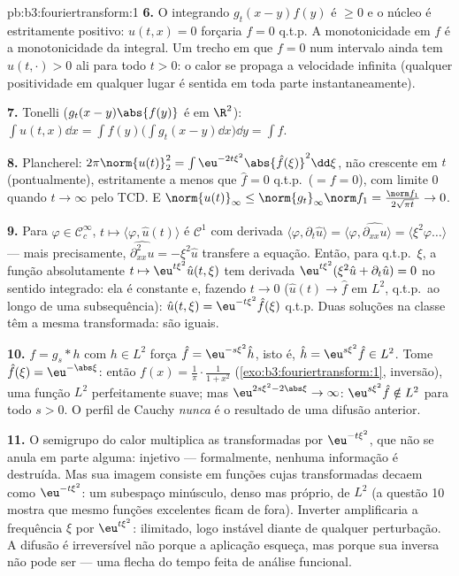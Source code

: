 \begin{solution}{pb:b3:fouriertransform:1}
\textbf{6.} O integrando $g_t(x-y)f(y)$ é $\geq 0$ e o
núcleo é estritamente positivo: $u(t,x) = 0$ forçaria $f = 0$
q.t.p. A monotonicidade em $f$ é a monotonicidade da integral. Um
trecho em que $f = 0$ num intervalo ainda tem $u(t, \cdot) > 0$
ali para todo $t > 0$: o calor se propaga a velocidade infinita
(qualquer positividade em qualquer lugar é sentida em toda parte instantaneamente).

\textbf{7.} Tonelli ($g_t(x-y)\abs{f(y)}$ é  em
$\R^2$): $\int u(t,x)\dd x = \int f(y)\bigl(\int g_t(x -
y)\dd x\bigr)\dd y = \int f$.

\textbf{8.} Plancherel: $2\pi\norm{u(t)}_2^2 =
\int\eu^{-2t\xi^2}\abs{\hat f(\xi)}^2\dd\xi$, não crescente em
$t$ (pontualmente), estritamente a menos que $\hat f = 0$ q.t.p.\ ($= f =
0$), com limite $0$ quando $t\to\infty$ pelo TCD. E
$\norm{u(t)}_\infty \leq \norm{g_t}_\infty\norm f_1 =
\frac{\norm f_1}{2\sqrt{\pi t}} \to 0$.

\textbf{9.} Para $\varphi \in \mathcal C_c^\infty$, $t \mapsto
\langle\varphi, \hat u(t)\rangle$ é $\mathcal C^1$ com
derivada $\langle\varphi, \partial_t\hat u\rangle =
\langle\varphi, \widehat{\partial_{xx}u}\rangle =
\langle\xi^2\varphi\dots\rangle$ --- mais precisamente,
$\widehat{\partial^2_{xx}u} = -\xi^2\hat u$ transfere a
equação. Então, para q.t.p.\ $\xi$, a função absolutamente 
$t \mapsto \eu^{t\xi^2}\hat u(t,\xi)$ tem derivada
$\eu^{t\xi^2}(\xi^2\hat u + \partial_t\hat u) = 0$ no
sentido integrado: ela é constante e, fazendo $t \to 0$
($\hat u(t) \to \hat f$ em $L^2$, q.t.p.\ ao longo de uma subsequência):
$\hat u(t, \xi) = \eu^{-t\xi^2}\hat f(\xi)$ q.t.p. Duas
soluções na classe têm a mesma transformada: são
iguais.

\textbf{10.} $f = g_s * h$ com $h \in L^2$ força $\hat f =
\eu^{-s\xi^2}\hat h$, isto é, $\hat h = \eu^{s\xi^2}\hat f \in
L^2$. Tome $\hat f(\xi) = \eu^{-\abs\xi}$: então $f(x) =
\frac1\pi\cdot\frac1{1 + x^2}$
(\cref{exo:b3:fouriertransform:1}, inversão), uma função $L^2$
perfeitamente suave; mas $\eu^{2s\xi^2 - 2\abs\xi} \to
\infty$: $\eu^{s\xi^2}\hat f \notin L^2$ para todo $s > 0$.
O perfil de Cauchy \emph{nunca} é o resultado de uma difusão
anterior.

\textbf{11.} O semigrupo do calor multiplica as transformadas por
$\eu^{-t\xi^2}$, que não se anula em parte alguma: injetivo ---
formalmente, nenhuma informação é destruída. Mas sua imagem consiste
em funções cujas transformadas decaem como $\eu^{-t\xi^2}$: um
subespaço minúsculo, denso mas próprio, de $L^2$ (a questão 10 mostra
que mesmo funções excelentes ficam de fora). Inverter
amplificaria a frequência $\xi$ por $\eu^{t\xi^2}$: ilimitado,
logo instável diante de qualquer perturbação. A difusão é
irreversível não porque a aplicação esqueça, mas porque sua
inversa não pode ser  --- uma flecha do tempo feita de
análise funcional.


\end{solution}
